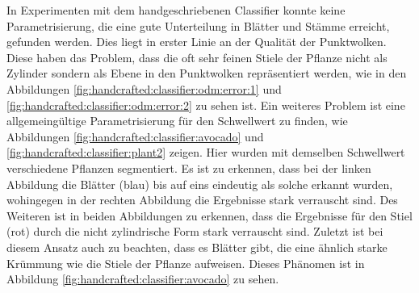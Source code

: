 \documentclass[12pt,titlepage, twoside]{article}
\begin{document}
In Experimenten mit dem handgeschriebenen Classifier konnte keine Parametrisierung, die eine gute Unterteilung in Blätter und Stämme erreicht, gefunden werden. 
Dies liegt in erster Linie an der Qualität der Punktwolken.
Diese haben das Problem, dass die oft sehr feinen Stiele der Pflanze nicht als Zylinder sondern als Ebene in den Punktwolken repräsentiert werden, 
wie in den Abbildungen \ref{fig:handcrafted:classifier:odm:error:1} und \ref{fig:handcrafted:classifier:odm:error:2} zu sehen ist.
Ein weiteres Problem ist eine allgemeingültige Parametrisierung für den Schwellwert zu finden, wie Abbildungen \ref{fig:handcrafted:classifier:avocado} und \ref{fig:handcrafted:classifier:plant2} zeigen. Hier wurden mit demselben Schwellwert verschiedene Pflanzen segmentiert.
Es ist zu erkennen, dass bei der linken Abbildung die Blätter (blau) bis auf eins eindeutig als solche erkannt wurden, wohingegen in der rechten Abbildung die Ergebnisse stark verrauscht sind. 
Des Weiteren ist in beiden Abbildungen zu erkennen, dass die Ergebnisse für den Stiel (rot) durch die nicht zylindrische Form stark verrauscht sind.
Zuletzt ist bei diesem Ansatz auch zu beachten, dass es Blätter gibt, die eine ähnlich starke Krümmung wie die Stiele der Pflanze aufweisen. Dieses Phänomen ist in Abbildung \ref{fig:handcrafted:classifier:avocado} zu sehen.
\end{document}
